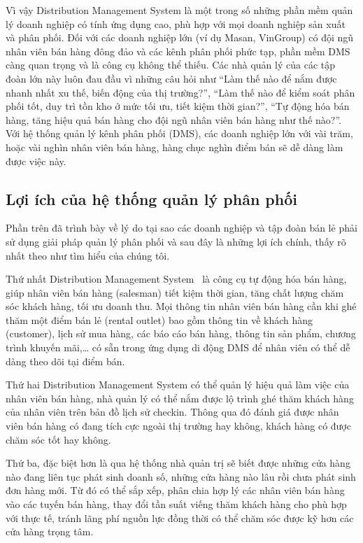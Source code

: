 Vì vậy Distribution Management System là một trong số những
phần mềm quản lý doanh nghiệp có tính ứng dụng cao, phù hợp với mọi
doanh nghiệp sản xuất và phân phối. Đối với các doanh nghiệp lớn
(ví dụ Masan, VinGroup) có đội ngũ nhân viên bán hàng đông đảo và các
kênh phân phối phức tạp, phần mềm DMS càng quan trọng và là công cụ không
thể thiếu. Các nhà quản lý của các tập đoàn lớn này luôn đau đầu vì
những câu hỏi như “Làm thế nào để nắm được nhanh nhất xu thế, biến động
của thị trường?”, “Làm thế nào để kiểm soát phân phối tốt, duy
trì tồn kho ở mức tối ưu, tiết kiệm thời gian?”, “Tự động hóa bán
hàng, tăng hiệu quả bán hàng cho đội ngũ nhân viên bán hàng như
thế nào?”. Với hệ thống quản lý kênh phân phối (DMS), các doanh nghiệp
lớn với vài trăm, hoặc vài nghìn nhân viên bán hàng, hàng chục
nghìn điểm bán sẽ dễ dàng làm được việc này.

\subsection{Lợi ích của hệ thống quản lý phân phối}
Phần trên đã trình bày về lý do tại sao các doanh nghiệp và tập
đoàn bán lẻ phải sử dụng giải pháp quản lý phân phối và sau đây
là những lợi ích chính, thấy rõ nhất theo như tìm hiểu của chúng tôi.

Thứ nhất Distribution Management System~\cite{dms:online}
là công cụ tự động hóa
bán hàng, giúp nhân viên bán hàng (salesman) tiết kiệm thời gian,
tăng chất lượng chăm sóc khách hàng, tối ưu doanh thu. Mọi thông
tin nhân viên bán hàng cần khi ghé thăm một điểm bán lẻ (rental outlet) 
bao gồm thông tin về khách hàng (customer), lịch sử mua hàng, 
các báo cáo bán hàng, thông tin sản phẩm, chương trình khuyến mãi,… 
có sẵn trong ứng dụng di động DMS để nhân viên có thể dễ dàng theo
dõi tại điểm bán.

Thứ hai Distribution Management System có thể quản lý hiệu quả
làm việc của nhân viên bán hàng, nhà quản lý có thể nắm được lộ
trình ghé thăm khách hàng của nhân viên trên bản đồ lịch sử checkin.
Thông qua đó đánh giá được nhân viên bán hàng có đang tích cực
ngoài thị trường hay không, khách hàng có được chăm sóc tốt hay không.

Thứ ba, đặc biệt hơn là qua hệ thống nhà quản trị sẽ biết
được những cửa hàng nào đang liên tục phát sinh doanh số, những cửa hàng
nào lâu rồi chưa phát sinh đơn hàng mới. Từ đó có thể sắp xếp,
phân chia hợp lý các nhân viên bán hàng vào các tuyến bán
hàng, thay đổi tần suất viếng thăm khách hàng cho phù hợp với
thực tế, tránh lãng phí nguồn lực đồng thời có thể chăm sóc được kỹ
hơn các cửa hàng trọng tâm.

